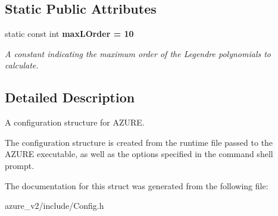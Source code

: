 \subsection*{Static Public Attributes}
\begin{CompactItemize}
\item 
static const int \bf{max\-LOrder} = 10\label{structConfig_e61ee372c6a694582ce5cfa760bcd4c7}

\begin{CompactList}\small\item\em A constant indicating the maximum order of the Legendre polynomials to calculate. \item\end{CompactList}\end{CompactItemize}


\subsection{Detailed Description}
A configuration structure for AZURE. 

The configuration structure is created from the runtime file passed to the AZURE executable, as well as the options specified in the command shell prompt. 



The documentation for this struct was generated from the following file:\begin{CompactItemize}
\item 
azure\_\-v2/include/Config.h\end{CompactItemize}
